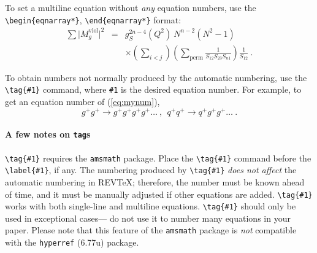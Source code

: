 \documentclass[%
 preprint, linenumbers,
 amsmath,amssymb,
 aps, physrev,
]{revtex4-2}
\begin{document}
To set a multiline equation without \emph{any} equation
numbers, use the \verb+\begin{eqnarray*}+,
\verb+\end{eqnarray*}+ format:
\begin{eqnarray*}
\sum \vert M^{\text{viol}}_g \vert ^2&=&g^{2n-4}_S(Q^2)~N^{n-2}
        (N^2-1)\\
 & &\times \left( \sum_{i<j}\right)
 \left(
  \sum_{\text{perm}}\frac{1}{S_{12}S_{23}S_{n1}}
 \right)
 \frac{1}{S_{12}}~.
\end{eqnarray*}

To obtain numbers not normally produced by the automatic numbering,
use the \verb+\tag{#1}+ command, where \verb+#1+ is the desired
equation number. For example, to get an equation number of
(\ref{eq:mynum}),
\begin{equation}
g^+g^+ \rightarrow g^+g^+g^+g^+ \dots ~,~~q^+q^+\rightarrow
q^+g^+g^+ \dots ~. \tag{2.6$'$}\label{eq:mynum}
\end{equation}

\paragraph{A few notes on \texttt{tag}s} 
\verb+\tag{#1}+ requires the \texttt{amsmath} package. 
Place the \verb+\tag{#1}+ command before the \verb+\label{#1}+, if any. 
The numbering produced by \verb+\tag{#1}+ \textit{does not affect} 
the automatic numbering in REV\TeX; 
therefore, the number must be known ahead of time, 
and it must be manually adjusted if other equations are added. 
\verb+\tag{#1}+ works with both single-line and multiline equations. 
\verb+\tag{#1}+ should only be used in exceptional cases---%
do not use it to number many equations in your paper. 
Please note that this feature of the \texttt{amsmath} package
is \emph{not} compatible with the \texttt{hyperref} (6.77u) package.
\end{document}
